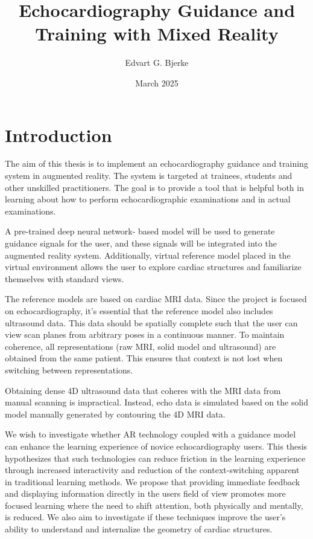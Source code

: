 \documentclass{article}
\title{Echocardiography Guidance and Training with Mixed Reality}
\author{Edvart G. Bjerke}
\date{March 2025}
\begin{document}
\maketitle

\section{Introduction}
The aim of this thesis is to implement an echocardiography guidance and training system in augmented reality. The system is targeted at trainees, students and other unskilled practitioners. The goal is to provide a tool that is helpful both in learning about how to perform echocardiographic examinations and in actual examinations.

A pre-trained deep neural network- based model will be used to generate guidance signals for the user, and these signals will be integrated into the augmented reality system.  
Additionally, virtual reference model placed in the virtual environment allows the user to explore cardiac structures and familiarize themselves with
standard views. 

The reference models are based on cardiac MRI data. 
Since the project is focused on echocardiography, it's essential that the reference model also includes ultrasound data.
This data should be spatially complete such that the user can view scan planes from arbitrary poses in a continuous manner.
To maintain coherence, all representations (raw MRI, solid model and ultrasound) are obtained from the same patient. This ensures that context is not lost when switching between representations.

Obtaining dense 4D ultrasound data that coheres with the MRI data from manual scanning is impractical. Instead,
echo data is simulated based on the solid model manually generated by contouring the 4D MRI data.

We wish to investigate whether AR technology coupled with a guidance model can enhance the learning experience of novice echocardiography users.
This thesis hypothesizes that such technologies can reduce friction in the learning experience through increased interactivity and reduction of the context-switching
apparent in traditional learning methods. We propose that providing immediate feedback and displaying information directly in the users field of view 
promotes more focused learning where the need to shift attention, both physically and mentally, is reduced. We also aim to investigate if these techniques 
improve the user's ability to understand and internalize the geometry of cardiac structures.
\end{document}
